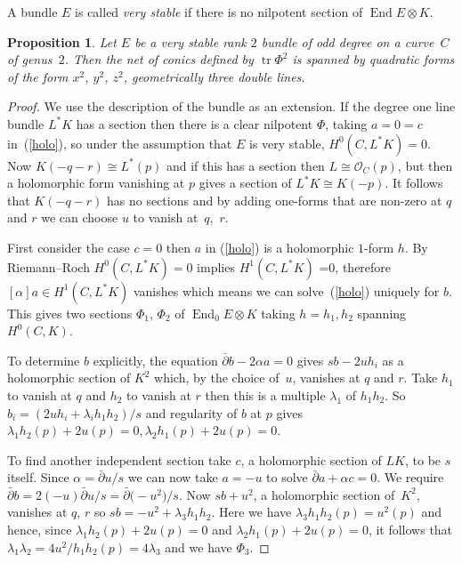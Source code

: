 \documentclass[10pt,a4paper]{amsart}
\numberwithin{equation}{section}
\newtheorem{Proposition}[Theorem]{Proposition}
 { \theoremstyle{definition}
\newtheorem{Remark}[Theorem]{Remark} }
\begin{document}
A bundle $E$ is called {\it very stable} if there is no nilpotent section of $\operatorname{End} E\otimes K$.

\begin{Proposition} Let $E$ be a very stable rank $2$ bundle of odd degree on a curve~$C$ of genus~$2$. Then the net of conics defined by $\operatorname{tr} \Phi^2$ is spanned by quadratic forms of the form $x^2$, $y^2$, $z^2$, geometrically three double lines.
\end{Proposition}

\begin{proof}
We use the description of the bundle as an extension. If the degree one line bundle $L^*K$ has a section then there is a clear nilpotent $\Phi$, taking $a=0=c$ in~(\ref{holo}), so under the assumption that $E$ is very stable, $H^0(C,L^*K)=0$. Now $K(-q-r)\cong L^*(p)$ and if this has a section then $L\cong \mathcal{O}_C(p)$, but then a holomorphic form vanishing at $p$ gives a section of $L^*K\cong K(-p)$. It follows that $K(-q-r)$ has no sections and by adding one-forms that are non-zero at $q$ and $r$ we can choose $u$ to vanish at~$q$,~$r$.

First consider the case $c=0$ then $a$ in (\ref{holo}) is a holomorphic $1$-form $h$. By Riemann--Roch $H^0(C,L^*K)=0$ implies $H^1(C,L^*K)$ =0, therefore $[\alpha] a\in H^1(C,L^*K)$ vanishes which means we can solve~(\ref{holo}) uniquely for $b$. This gives two sections $\Phi_1$, $\Phi_2$ of $\operatorname{End}_0E\otimes K$ taking $h=h_1,h_2$ spanning~$H^0(C,K)$.

To determine $b$ explicitly, the equation $\bar\partial b - 2\alpha a=0$ gives $sb-2uh_i$ as a holomorphic section of $K^2$ which, by the choice of~$u$, vanishes at $q$ and $r$. Take $h_1$ to vanish at $q$ and $h_2$ to vanish at $r$ then this is a multiple $\lambda_1$ of $h_1h_2$. So $b_i=(2uh_i+\lambda_ih_1h_2)/s$ and regularity of $b$ at $p$ gives $\lambda_1h_2(p)+2u(p)=0, \lambda_2h_1(p)+2u(p)=0$.

To find another independent section
take $c$, a holomorphic section of $LK$, to be $s$ itself.
Since $\alpha=\bar\partial u/s$ we can now take $a= -u$ to solve $\bar\partial a+\alpha c=0$.
We require
$\bar\partial b=2(-u)\bar\partial u/s=\bar\partial\big({-}u^2\big)/s$.
Now $sb+u^2$, a holomorphic section of~$K^2$, vanishes at $q$, $r$ so $sb =-u^2+\lambda_3h_1h_2$. Here we have $\lambda_3h_1h_2(p)=u^2(p)$ and hence, since $\lambda_1h_2(p)+2u(p)=0$ and $\lambda_2h_1(p)+2u(p)=0$,
it follows that $ \lambda_1\lambda_2=4u^2/h_1h_2(p)=4\lambda_3$
and we have $\Phi_3$.


\end{proof}
\end{document}
